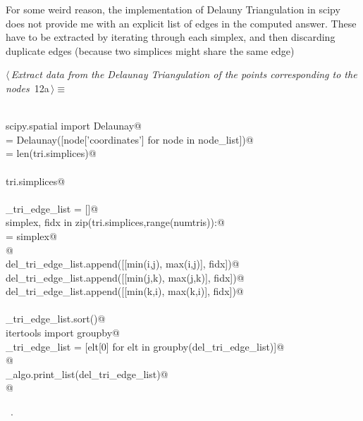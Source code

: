 \documentclass[11.5pt]{report}
\begin{document}
For some weird reason, the implementation of Delauny Triangulation in scipy does not 
provide me with an explicit list of edges in the computed answer. These have to be 
extracted by iterating through each simplex, and then discarding duplicate edges 
(because two simplices might share the same edge)

\begin{flushleft} \small
\begin{minipage}{\linewidth}\label{scrap13}\raggedright\small
{} $\langle\,${\itshape Extract data from the Delaunay Triangulation of the points corresponding to the nodes}\nobreak\ {\footnotesize {12a}}$\,\rangle\equiv$
\vspace{-1ex}
\begin{list}{}{} \item
\mbox{}\verb@@\\
\mbox{}\verb@from scipy.spatial import Delaunay@\\
\mbox{}\verb@tri = Delaunay([node['coordinates'] for node in node_list])@\\
\mbox{}\verb@numtris = len(tri.simplices)@\\
\mbox{}\verb@@\\
\mbox{}\verb@print tri.simplices@\\
\mbox{}\verb@@\\
\mbox{}\verb@del_tri_edge_list = []@\\
\mbox{}\verb@for simplex, fidx in zip(tri.simplices,range(numtris)):@\\
\mbox{}\verb@        [i,j,k] = simplex@\\
\mbox{}\verb@        @\\
\mbox{}\verb@        del_tri_edge_list.append([[min(i,j), max(i,j)], fidx])@\\
\mbox{}\verb@        del_tri_edge_list.append([[min(j,k), max(j,k)], fidx])@\\
\mbox{}\verb@        del_tri_edge_list.append([[min(k,i), max(k,i)], fidx])@\\
\mbox{}\verb@@\\
\mbox{}\verb@del_tri_edge_list.sort()@\\
\mbox{}\verb@from itertools import groupby@\\
\mbox{}\verb@del_tri_edge_list = [elt[0] for elt in groupby(del_tri_edge_list)]@\\
\mbox{}\verb@ @\\
\mbox{}\verb@utils_algo.print_list(del_tri_edge_list)@\\
\mbox{}\verb@   @\\
\mbox{}\verb@@{\NWsep}
\end{list}
\vspace{-1.5ex}
\footnotesize
\begin{list}{}{\setlength{\itemsep}{-\parsep}\setlength{\itemindent}{-\leftmargin}}
\item \NWtxtMacroRefIn\ .

\item{}
\end{list}
\end{minipage}\vspace{4ex}
\end{flushleft}
\end{document}
